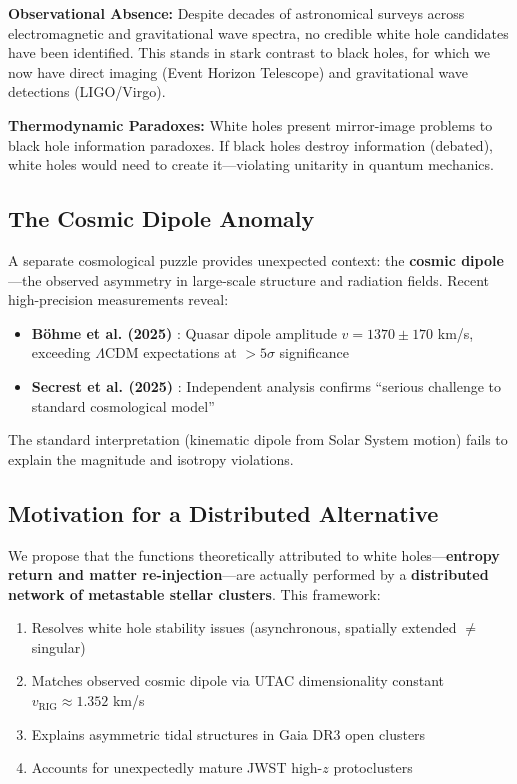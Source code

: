\documentclass[11pt,a4paper,twocolumn]{article}
\begin{document}
\textbf{Observational Absence:} Despite decades of astronomical surveys across electromagnetic and gravitational wave spectra, no credible white hole candidates have been identified. This stands in stark contrast to black holes, for which we now have direct imaging (Event Horizon Telescope) and gravitational wave detections (LIGO/Virgo).

\textbf{Thermodynamic Paradoxes:} White holes present mirror-image problems to black hole information paradoxes. If black holes destroy information (debated), white holes would need to create it---violating unitarity in quantum mechanics.

\subsection{The Cosmic Dipole Anomaly}

A separate cosmological puzzle provides unexpected context: the \textbf{cosmic dipole}---the observed asymmetry in large-scale structure and radiation fields. Recent high-precision measurements reveal:

\begin{itemize}
    \item \textbf{Böhme et al. (2025)} \citep{bohme2025}: Quasar dipole amplitude $v = 1370 \pm 170$ km/s, exceeding $\Lambda$CDM expectations at $>5\sigma$ significance
    \item \textbf{Secrest et al. (2025)} \citep{secrest2025}: Independent analysis confirms ``serious challenge to standard cosmological model''
\end{itemize}

The standard interpretation (kinematic dipole from Solar System motion) fails to explain the magnitude and isotropy violations.

\subsection{Motivation for a Distributed Alternative}

We propose that the functions theoretically attributed to white holes---\textbf{entropy return and matter re-injection}---are actually performed by a \textbf{distributed network of metastable stellar clusters}. This framework:

\begin{enumerate}
    \item Resolves white hole stability issues (asynchronous, spatially extended $\neq$ singular)
    \item Matches observed cosmic dipole via UTAC dimensionality constant $v_{\text{RIG}} \approx 1.352$ km/s
    \item Explains asymmetric tidal structures in Gaia DR3 open clusters \citep{risbud2025,sharma2025}
    \item Accounts for unexpectedly mature JWST high-$z$ protoclusters \citep{mayer2025}
\end{enumerate}
\end{document}
